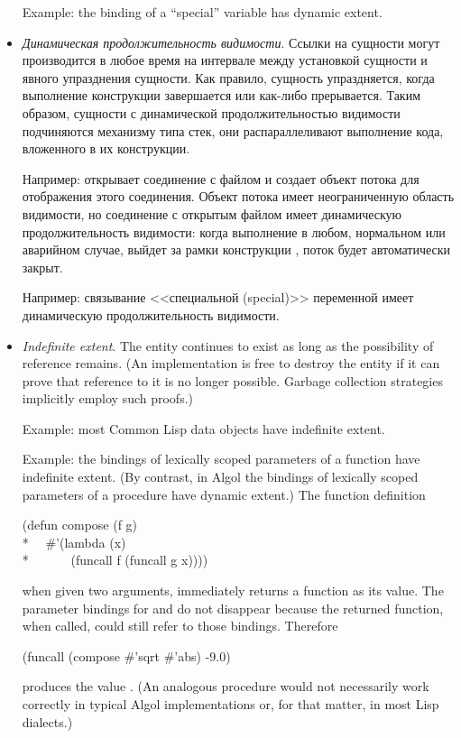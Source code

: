 \begin{itemize}
Example: the binding of a ``special'' variable has dynamic extent.

\item
\emph{Динамическая продолжительность видимости}. Ссылки на сущности могут
производится в любое время на интервале между установкой сущности и явного
упразднения сущности. Как правило, сущность упраздняется, когда выполнение конструкции
завершается или как-либо прерывается. Таким образом, сущности с динамической
продолжительностью видимости подчиняются механизму типа стек, они распараллеливают
выполнение кода, вложенного в их конструкции.

Например:  открывает соединение с файлом и создает объект
потока для отображения этого соединения. Объект потока имеет неограниченную область
видимости, но соединение с открытым файлом имеет динамическую продолжительность
видимости: когда выполнение в любом, нормальном или аварийном случае, выйдет за
рамки конструкции , поток будет автоматически закрыт.

Например: связывание <<специальной (special)>> переменной имеет динамическую
продолжительность видимости.

\item
\emph{Indefinite extent}.  The entity continues to exist as long as the
possibility of reference remains.  (An implementation is free to
destroy the entity if it can prove that reference to it is no longer possible.
Garbage collection strategies implicitly employ such proofs.)

Example: most Common Lisp data objects have indefinite extent.

Example: the bindings of lexically scoped parameters of a function have
indefinite extent.  (By contrast, in Algol the bindings of lexically scoped
parameters of a procedure have dynamic extent.)
The function definition
\begin{lisp}
(defun compose (f g) \\*
~~\#'(lambda (x) \\*
~~~~~~(funcall f (funcall g x))))
\end{lisp}
when given two arguments, immediately returns a function as its value.
The parameter bindings for  and  do not disappear because the
returned function, when called, could still refer to those bindings.
Therefore
\begin{lisp}
(funcall (compose \#'sqrt \#'abs) -9.0)
\end{lisp}
produces the value .  (An analogous procedure would not necessarily work
correctly in typical Algol implementations or, for that matter,
in most Lisp dialects.)


\end{itemize}
